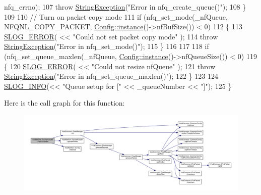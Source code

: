 \begin{DoxyCode}
      nfq\_errno);
107         \textcolor{keywordflow}{throw} \hyperlink{class_vsid_common_1_1_string_exception}{StringException}(\textcolor{stringliteral}{"Error in nfq\_create\_queue()"});
108     \}
109 
110     \textcolor{comment}{// Turn on packet copy mode}
111     \textcolor{keywordflow}{if} (nfq\_set\_mode(\_nfQueue, NFQNL\_COPY\_PACKET, \hyperlink{class_vsid_netfilter_1_1_config_abf1d4539011ef83cac0fef2ac864a3a9}{Config::instance}()->nfBufSize()) < 0) 
112     \{
113         \hyperlink{_logger_8h_a2a8694cd392d18f4db6b9cc9f15bafe3}{SLOG\_ERROR}( << \textcolor{stringliteral}{"Could not set packet copy mode"} );
114         \textcolor{keywordflow}{throw} \hyperlink{class_vsid_common_1_1_string_exception}{StringException}(\textcolor{stringliteral}{"Error in nfq\_set\_mode()"});
115     \}
116 
117 
118     \textcolor{keywordflow}{if} (nfq\_set\_queue\_maxlen(\_nfQueue, \hyperlink{class_vsid_netfilter_1_1_config_abf1d4539011ef83cac0fef2ac864a3a9}{Config::instance}()->nfQueueSize()) < 0)
119     \{
120         \hyperlink{_logger_8h_a2a8694cd392d18f4db6b9cc9f15bafe3}{SLOG\_ERROR}( << \textcolor{stringliteral}{"Could not resize nfQueue"} );
121         \textcolor{keywordflow}{throw} \hyperlink{class_vsid_common_1_1_string_exception}{StringException}(\textcolor{stringliteral}{"Error in nfq\_set\_queue\_maxlen()"});
122     \}
123 
124     \hyperlink{_logger_8h_a119c1c29ba35a8db38e2358e41167282}{SLOG\_INFO}(<< \textcolor{stringliteral}{"Queue setup for ["} << \_queueNumber << \textcolor{stringliteral}{"]"});
125 \}
\end{DoxyCode}


Here is the call graph for this function\-:
\nopagebreak
\begin{figure}[H]
\begin{center}
\leavevmode
\includegraphics[width=350pt]{class_vsid_netfilter_1_1_packet_handler_ad5cc80ce9ffd9d456d4578ddf2bc957c_cgraph}
\end{center}
\end{figure}


